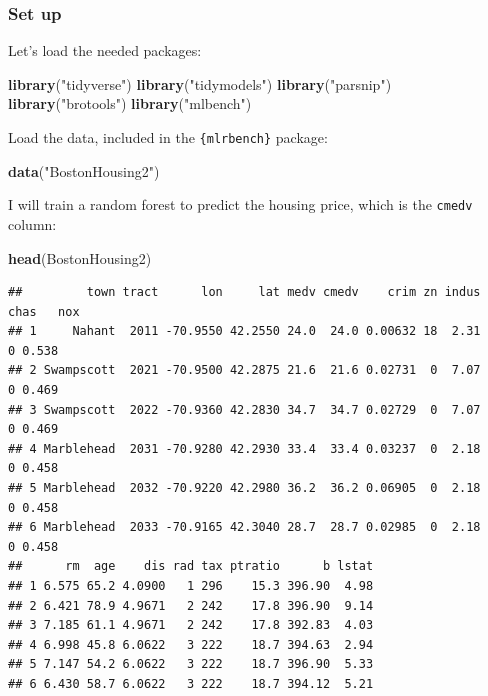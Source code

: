 \documentclass[]{gitbook}
\newenvironment{Shaded}{\begin{snugshade}}{\end{snugshade}}
\newcommand{\KeywordTok}[1]{\textcolor[rgb]{0.13,0.29,0.53}{\textbf{#1}}}
\newcommand{\NormalTok}[1]{#1}
\newcommand{\StringTok}[1]{\textcolor[rgb]{0.31,0.60,0.02}{#1}}
\theoremstyle{definition}
\theoremstyle{definition}
\theoremstyle{definition}
\theoremstyle{remark}
\begin{document}
\hypertarget{set-up}{%
\subsubsection{Set up}\label{set-up}}

Let's load the needed packages:

\begin{Shaded}
\begin{Highlighting}[]
\KeywordTok{library}\NormalTok{(}\StringTok{"tidyverse"}\NormalTok{)}
\KeywordTok{library}\NormalTok{(}\StringTok{"tidymodels"}\NormalTok{)}
\KeywordTok{library}\NormalTok{(}\StringTok{"parsnip"}\NormalTok{)}
\KeywordTok{library}\NormalTok{(}\StringTok{"brotools"}\NormalTok{)}
\KeywordTok{library}\NormalTok{(}\StringTok{"mlbench"}\NormalTok{)}
\end{Highlighting}
\end{Shaded}

Load the data, included in the \texttt{\{mlrbench\}} package:

\begin{Shaded}
\begin{Highlighting}[]
\KeywordTok{data}\NormalTok{(}\StringTok{"BostonHousing2"}\NormalTok{)}
\end{Highlighting}
\end{Shaded}

I will train a random forest to predict the housing price, which is the
\texttt{cmedv} column:

\begin{Shaded}
\begin{Highlighting}[]
\KeywordTok{head}\NormalTok{(BostonHousing2)}
\end{Highlighting}
\end{Shaded}

\begin{verbatim}
##         town tract      lon     lat medv cmedv    crim zn indus chas   nox
## 1     Nahant  2011 -70.9550 42.2550 24.0  24.0 0.00632 18  2.31    0 0.538
## 2 Swampscott  2021 -70.9500 42.2875 21.6  21.6 0.02731  0  7.07    0 0.469
## 3 Swampscott  2022 -70.9360 42.2830 34.7  34.7 0.02729  0  7.07    0 0.469
## 4 Marblehead  2031 -70.9280 42.2930 33.4  33.4 0.03237  0  2.18    0 0.458
## 5 Marblehead  2032 -70.9220 42.2980 36.2  36.2 0.06905  0  2.18    0 0.458
## 6 Marblehead  2033 -70.9165 42.3040 28.7  28.7 0.02985  0  2.18    0 0.458
##      rm  age    dis rad tax ptratio      b lstat
## 1 6.575 65.2 4.0900   1 296    15.3 396.90  4.98
## 2 6.421 78.9 4.9671   2 242    17.8 396.90  9.14
## 3 7.185 61.1 4.9671   2 242    17.8 392.83  4.03
## 4 6.998 45.8 6.0622   3 222    18.7 394.63  2.94
## 5 7.147 54.2 6.0622   3 222    18.7 396.90  5.33
## 6 6.430 58.7 6.0622   3 222    18.7 394.12  5.21
\end{verbatim}
\end{document}

